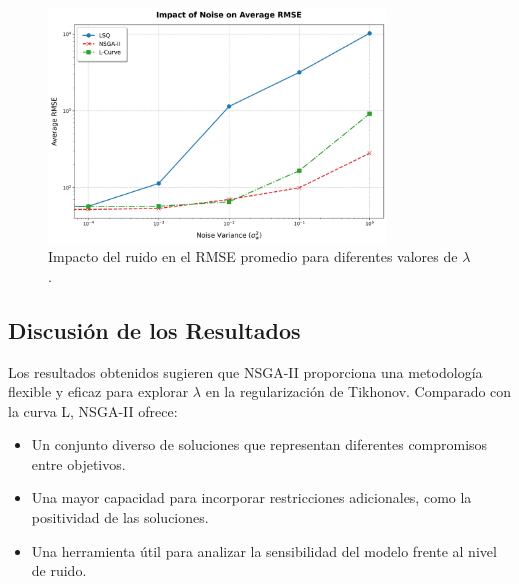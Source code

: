 \begin{figure}[h]
    \centering
    \includegraphics[width=0.8\textwidth]{Images/impact_of_noise_on_rmse_single.png}
    \caption{Impacto del ruido en el RMSE promedio para diferentes valores de \( \lambda \).}
    \label{fig:pareto_noise}
\end{figure}

\subsection{Discusión de los Resultados} \label{sec:results:discussion}

Los resultados obtenidos sugieren que NSGA-II proporciona una metodología flexible y eficaz para explorar \( \lambda \) en la regularización de Tikhonov. Comparado con la curva L, NSGA-II ofrece:
\begin{itemize}
    \item Un conjunto diverso de soluciones que representan diferentes compromisos entre objetivos.
    \item Una mayor capacidad para incorporar restricciones adicionales, como la positividad de las soluciones.
    \item Una herramienta útil para analizar la sensibilidad del modelo frente al nivel de ruido.
\end{itemize}
